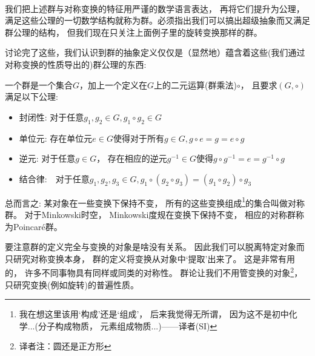 \

我们把上述群与对称变换的特征用严谨的数学语言表达， 再将它们提升为公理， 满足这些公理的一切数学结构就称为群。必须指出我们可以搞出超级抽象而又满足群公理的结构， 但我们现在只关注上面例子里的旋转变换那样的群。

讨论完了这些，我们认识到群的抽象定义仅仅是（显然地）蕴含着这些(我们通过对称变换的性质导出的)群公理的东西:

一个群是一个集合$G$，加上一个定义在$G$上的二元运算(群乘法)$\circ$， 且要求$(G, \circ)$满足以下公理:
\begin{itemize}
	\item 封闭性: 对于任意$g_1, g_2 \in G, g_1 \circ g_2 \in G$

	\item 单位元: 存在单位元$e \in G$使得对于所有$g \in G, g\circ e = g = e \circ g$

	\item 逆元: 对于任意$g \in G$， 存在相应的逆元$g^{-1} \in G$使得$g \circ g^{-1} = e = g^{-1} \circ g$

	\item 结合律:　对于任意$g_1, g_2, g_3 \in G, g_1 \circ (g_2 \circ g_3) = (g_1 \circ g_2) \circ g_3$
\end{itemize}

总而言之: 某对象在一些变换下保持不变， 所有的这些变换组成\footnote{我在想这里该用`构成'还是`组成'， 后来我觉得无所谓， 因为这不是初中化学...(分子构成物质， 元素组成物质...)——译者(SI)}的集合叫做对称群。 对于Minkowski时空， Minkowski度规在变换下保持不变， 相应的对称群称为Poincar\'e群。

要注意群的定义完全与变换的对象是啥没有关系。 因此我们可以脱离特定对象而只研究对称变换本身， 群的定义将变换从对象中`提取'出来了。 这是非常有用的， 许多不同事物具有同样或同类的对称性。 群论让我们不用管变换的对象\footnote{译者注：圆还是正方形}， 只研究变换(例如旋转)的普遍性质。


